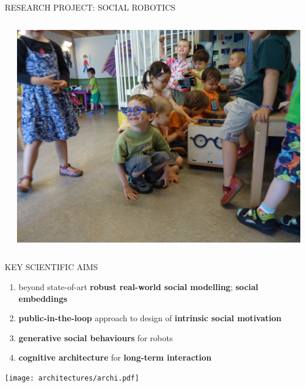 \documentclass[xcolor=table]{beamer}
\begin{document}
\begin{frame}{RESEARCH PROJECT: SOCIAL ROBOTICS}
\begin{columns}
\begin{column}{0.7\linewidth}
{            }
        \end{column}
        \begin{column}{0.3\linewidth}
            \begin{center}
                \includegraphics[trim=15cm 0 11cm 0,clip,width=\linewidth]{ranger/ranger_funny_glasses}
            \end{center}
        \end{column}
    \end{columns}


\end{frame}

\begin{frame}{KEY SCIENTIFIC AIMS}

    \begin{enumerate}
        \scriptsize
        \item beyond state-of-art \textbf{robust real-world social modelling}; \textbf{social embeddings}
        \item \textbf{public-in-the-loop} approach to design of \textbf{intrinsic social motivation}
        \item \textbf{generative social behaviours} for robots
        \item \textbf{cognitive architecture} for \textbf{long-term interaction}
    \end{enumerate}

    \begin{center}
        \texttt{[image: architectures/archi.pdf]}
    \end{center}
\end{frame}
\end{document}
